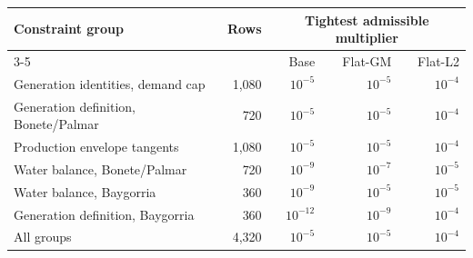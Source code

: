 \begin{tabular}{lrrrr}
\toprule
Constraint group & Rows & \multicolumn{3}{c}{Tightest admissible multiplier} \\
\cmidrule(lr){3-5}
 &  & Base & Flat-GM & Flat-L2 \\
\midrule
Generation identities, demand cap & 1,080 & $10^{-5}$ & $10^{-5}$ & $10^{-4}$ \\
Generation definition, Bonete/Palmar & 720 & $10^{-5}$ & $10^{-5}$ & $10^{-4}$ \\
Production envelope tangents & 1,080 & $10^{-5}$ & $10^{-5}$ & $10^{-4}$ \\
Water balance, Bonete/Palmar & 720 & $10^{-9}$ & $10^{-7}$ & $10^{-5}$ \\
Water balance, Baygorria & 360 & $10^{-9}$ & $10^{-5}$ & $10^{-5}$ \\
Generation definition, Baygorria & 360 & $10^{-12}$ & $10^{-9}$ & $10^{-4}$ \\
\midrule
All groups & 4,320 & $10^{-5}$ & $10^{-5}$ & $10^{-4}$ \\
\bottomrule
\end{tabular}
